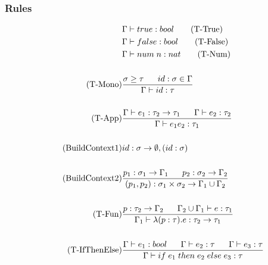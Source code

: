 \documentclass[10pt,a4paper]{report}
\begin{document}
\subsubsection{Rules}
\begin{align*}
&\Gamma \vdash true : bool \tag{T-True} \\
&\Gamma \vdash false : bool \tag{T-False} \\
&\Gamma \vdash num \; n : nat \tag{T-Num} \\ \\
\tag{T-Mono}
&\frac{\sigma \geq \tau \longspace id:\sigma \in \Gamma}{\Gamma \vdash id:\tau}\\ \\
\tag{T-App}
&\frac{\Gamma \vdash e_{1}:\tau_{2} \rightarrow \tau_{1} \longspace \Gamma \vdash e_{2}:\tau_{2}}
{\Gamma \vdash e_{1}e_{2}:\tau_{1}} \\ \\
\tag{BuildContext1}
& id:\sigma \rightarrow \emptyset, (id:\sigma) \\ \\
\tag{BuildContext2}
&\frac{p_{1}:\sigma_{1} \rightarrow \Gamma_{1} \longspace p_{2}:\sigma_{2}\rightarrow \Gamma_{2}}
{(p_{1},p_{2}):\sigma_{1}\times \sigma_{2} \rightarrow \Gamma_{1}\cup \Gamma_{2}} \\ \\
\tag{T-Fun}
&\frac{p:\tau_{2} \rightarrow \Gamma_{2} \longspace \Gamma_{2} \cup \Gamma_{1} \vdash e:\tau_{1}}
{\Gamma_{1} \vdash \lambda(p:\tau).e:\tau_{2} \rightarrow \tau_{1}} \\ \\
\tag{T-IfThenElse}
&\frac{\Gamma \vdash e_{1}:bool \longspace \Gamma \vdash e_{2}:\tau \longspace \Gamma \vdash e_{3} : \tau}
{\Gamma \vdash if \; e_{1} \; then \; e_{2} \; else \; e_{3} : \tau} \\ \\

\end{align*}
\end{document}
